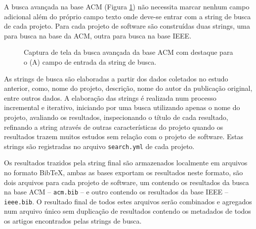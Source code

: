 A busca avançada na base ACM (Figura \ref{advanced-search-acm}) não necessita
marcar nenhum campo adicional além do próprio campo texto onde deve-se entrar
com a string de busca de cada projeto. Para cada projeto de software são construídas duas strings, uma para busca na
base da ACM, outra para busca na base IEEE.

\begin{figure}[h]
  \center
  \caption{Captura de tela da busca avançada da base ACM com destaque para o (A) campo de entrada da string de busca.}
  \label{advanced-search-acm}
\end{figure}

As strings de busca são elaboradas a partir dos dados coletados no estudo
anterior, como, nome do projeto, descrição, nome do autor da publicação
original, entre outros dados. A elaboração das strings é realizada num processo
incremental e iterativo, iniciando por uma busca utilizando apenas o nome do
projeto, avaliando os resultados, inspecionando o título de cada resultado,
refinando a string através de outras características do projeto quando os
resultados trazem muitos estudos sem relação com o projeto de software. Estas
strings são registradas no arquivo \texttt{search.yml} de cada projeto.


Os resultados trazidos pela string final são armazenados localmente em arquivos
no formato BibTeX, ambas as bases exportam os resultados neste formato, são
dois arquivos para cada projeto de software, um contendo os resultados da busca
na base ACM -- \texttt{acm.bib} -- e outro contendo os resultados da base IEEE
-- \texttt{ieee.bib}. O resultado final de todos estes arquivos serão
combinados e agregados num arquivo único sem duplicação de resultados contendo
os metadados de todos os artigos encontrados pelas strings de busca.

